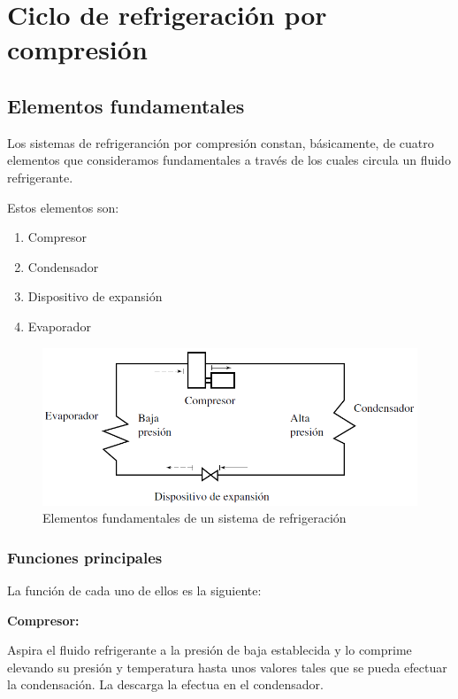 \section{Ciclo de refrigeración por compresión}

\subsection{Elementos fundamentales}

Los sistemas de refrigeranción por compresión constan, básicamente, de cuatro elementos que consideramos fundamentales a través de los cuales circula un fluido refrigerante.

Estos elementos son:

\begin{enumerate}
	\item Compresor
	\item Condensador
	\item Dispositivo de expansión
	\item Evaporador
\end{enumerate}

\begin{figure}[h]
	\centering
	\includegraphics[width=\textwidth]{figuras/elementos fundamentales.png}
	\caption{Elementos fundamentales de un sistema de refrigeración}
	\label{fig:elementos_fundamentales}
\end{figure}


\subsubsection{Funciones principales}

La función de cada uno de ellos es la siguiente:

\textbf{Compresor:}

Aspira el fluido refrigerante a la presión de baja establecida y lo comprime elevando su presión y temperatura hasta unos valores tales que se pueda efectuar la condensación. La descarga la efectua en el condensador.

